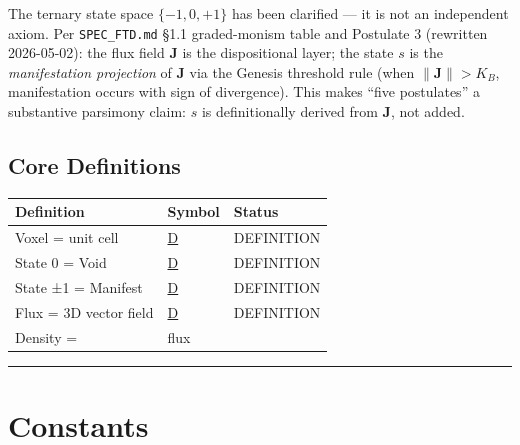 \documentclass[
  11pt,
  letterpaper,
  twoside,
  openright]{book}
\begin{document}
\begin{tcolorbox}[enhanced jigsaw, coltitle=black, colbacktitle=quarto-callout-note-color!10!white, toprule=.15mm, colframe=quarto-callout-note-color-frame, arc=.35mm, opacityback=0, bottomtitle=1mm, toptitle=1mm, breakable, colback=white, titlerule=0mm, opacitybacktitle=0.6, title=\textcolor{quarto-callout-note-color}{\faInfo}\hspace{0.5em}{Ternary States: J-primary, \(s\) as manifestation projection
(post-2026-05-02 MC-T4.1 reframe)}, rightrule=.15mm, bottomrule=.15mm, leftrule=.75mm, left=2mm]

The ternary state space \(\{-1, 0, +1\}\) has been clarified --- it is
not an independent axiom. Per \texttt{SPEC\_FTD.md} §1.1 graded-monism
table and Postulate 3 (rewritten 2026-05-02): the flux field
\(\mathbf{J}\) is the dispositional layer; the state \(s\) is the
\emph{manifestation projection} of \(\mathbf{J}\) via the Genesis
threshold rule (when \(\|\mathbf{J}\| > K_B\), manifestation occurs with
sign of divergence). This makes ``five postulates'' a substantive
parsimony claim: \(s\) is definitionally derived from \(\mathbf{J}\),
not added.

\end{tcolorbox}

\subsection{Core Definitions}\label{core-definitions}

\begin{longtable}[]{@{}lll@{}}
\toprule\noalign{}
Definition & Symbol & Status \\
\midrule\noalign{}
\endhead
\bottomrule\noalign{}
\endlastfoot
Voxel = unit cell & \hyperref[d]{D} & DEFINITION \\
State 0 = Void & \hyperref[d]{D} & DEFINITION \\
State ±1 = Manifest & \hyperref[d]{D} & DEFINITION \\
Flux = 3D vector field & \hyperref[d]{D} & DEFINITION \\
Density = & flux & \\
\end{longtable}

\begin{center}\rule{0.5\linewidth}{0.5pt}\end{center}

\section{Constants}\label{constants}
\end{document}
